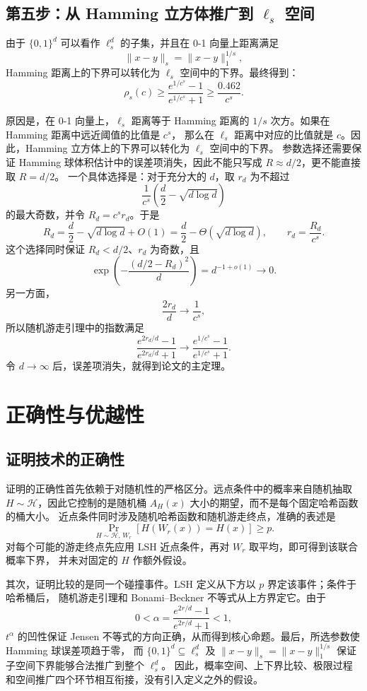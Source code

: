 \documentclass[UTF8,11pt,a4paper]{ctexart}
\newcommand{\Prb}{\operatorname{Pr}}
\begin{document}
\subsection{第五步：从 Hamming 立方体推广到 \texorpdfstring{$\ell_s$}{l-s} 空间}

由于 $\{0,1\}^d$ 可以看作 $\ell_s^d$ 的子集，并且在 0-1 向量上距离满足
\[
  \|x-y\|_s = \|x-y\|_1^{1/s},
\]
Hamming 距离上的下界可以转化为 $\ell_s$ 空间中的下界。最终得到：
\[
  \rho_s(c)
  \ge
  \frac{e^{1/c^s}-1}{e^{1/c^s}+1}
  \ge
  \frac{0.462}{c^s}.
\]

原因是，在 0-1 向量上，$\ell_s$ 距离等于 Hamming 距离的 $1/s$ 次方。如果在 Hamming 距离中远近阈值的比值是 $c^s$，
那么在 $\ell_s$ 距离中对应的比值就是 $c$。因此，Hamming 立方体上的下界可以转化为 $\ell_s$ 空间中的下界。
参数选择还需要保证 Hamming 球体积估计中的误差项消失，因此不能只写成 $R\approx d/2$，更不能直接取 $R=d/2$。
一个具体选择是：对于充分大的 $d$，取 $r_d$ 为不超过
\[
  \frac{1}{c^s}
  \left(\frac d2-\sqrt{d\log d}\right)
\]
的最大奇数，并令 $R_d=c^s r_d$。于是
\[
  R_d
  =
  \frac d2-\sqrt{d\log d}+O(1)
  =
  \frac d2-\Theta(\sqrt{d\log d}),
  \qquad
  r_d=\frac{R_d}{c^s}.
\]
这个选择同时保证 $R_d<d/2$、$r_d$ 为奇数，且
\[
  \exp\left(-\frac{(d/2-R_d)^2}{d}\right)
  =d^{-1+o(1)}
  \longrightarrow 0.
\]
另一方面，
\[
  \frac{2r_d}{d}\longrightarrow\frac{1}{c^s},
\]
所以随机游走引理中的指数满足
\[
  \frac{e^{2r_d/d}-1}{e^{2r_d/d}+1}
  \longrightarrow
  \frac{e^{1/c^s}-1}{e^{1/c^s}+1}.
\]
令 $d\to\infty$ 后，误差项消失，就得到论文的主定理。

\section{正确性与优越性}

\subsection{证明技术的正确性}

证明的正确性首先依赖于对随机性的严格区分。远点条件中的概率来自随机抽取
$H\sim\mathcal H$，因此它控制的是随机桶 $A_H(x)$ 大小的期望，而不是每个固定哈希函数的桶大小。
近点条件同时涉及随机哈希函数和随机游走终点，准确的表述是
\[
  \Prb_{H\sim\mathcal H,\,W_r}
  [H(W_r(x))=H(x)]\ge p.
\]
对每个可能的游走终点先应用 LSH 近点条件，再对 $W_r$ 取平均，即可得到该联合概率下界，
并未对固定的 $H$ 作额外假设。

其次，证明比较的是同一个碰撞事件。LSH 定义从下方以 $p$ 界定该事件；条件于哈希桶后，
随机游走引理和 Bonami--Beckner 不等式从上方界定它。由于
\[
  0<\alpha=\frac{e^{2r/d}-1}{e^{2r/d}+1}<1,
\]
$t^\alpha$ 的凹性保证 Jensen 不等式的方向正确，从而得到核心命题。最后，所选参数使 Hamming 球误差项趋于零，
而 $\{0,1\}^d\subseteq\ell_s^d$ 及
$\|x-y\|_s=\|x-y\|_1^{1/s}$ 保证子空间下界能够合法推广到整个 $\ell_s^d$。
因此，概率空间、上下界比较、极限过程和空间推广四个环节相互衔接，没有引入定义之外的假设。
\end{document}
